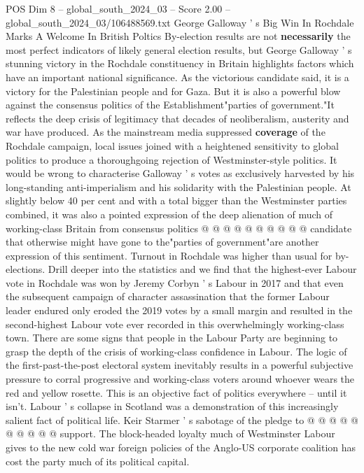\begin{textsample}{POS Dim 8 – global\_south\_2024\_03 – Score 2.00 – global\_south\_2024\_03/106488569.txt}  \label{ex:f8_pos_427}
George Galloway ' s Big Win In Rochdale Marks A Welcome In British Poltics By-election results are not \textbf{necessarily} the most perfect indicators of likely general election results, but George Galloway ' s stunning victory in the Rochdale constituency in Britain highlights factors which have an important national significance.
As the victorious candidate said, it is a victory for the Palestinian people and for Gaza.
But it is also a powerful blow against the consensus politics of the Establishment"parties of government."It reflects the deep crisis of legitimacy that decades of neoliberalism, austerity and war have produced.
As the mainstream media suppressed \textbf{coverage} of the Rochdale campaign, local issues joined with a heightened sensitivity to global politics to produce a thoroughgoing rejection of Westminster-style politics.
It would be wrong to characterise Galloway ' s votes as exclusively harvested by his long-standing anti-imperialism and his solidarity with the Palestinian people.
At slightly below 40 per cent and with a total bigger than the Westminster parties combined, it was also a pointed expression of the deep alienation of much of working-class Britain from consensus politics @ @ @ @ @ @ @ @ @ @ candidate that otherwise might have gone to the"parties of government"are another expression of this sentiment.
Turnout in Rochdale was higher than usual for by-elections.
Drill deeper into the statistics and we find that the highest-ever Labour vote in Rochdale was won by Jeremy Corbyn ' s Labour in 2017 and that even the subsequent campaign of character assassination that the former Labour leader endured only eroded the 2019 votes by a small margin and resulted in the second-highest Labour vote ever recorded in this overwhelmingly working-class town.
There are some signs that people in the Labour Party are beginning to grasp the depth of the crisis of working-class confidence in Labour.
The logic of the first-past-the-post electoral system inevitably results in a powerful subjective pressure to corral progressive and working-class voters around whoever wears the red and yellow rosette.
This is an objective fact of politics everywhere -- until it isn't.
Labour ' s collapse in Scotland was a demonstration of this increasingly salient fact of political life.
Keir Starmer ' s sabotage of the pledge to @ @ @ @ @ @ @ @ @ @ support.
The block-headed loyalty much of Westminster Labour gives to the new cold war foreign policies of the Anglo-US corporate coalition has cost the party much of its political capital.

\end{textsample}
